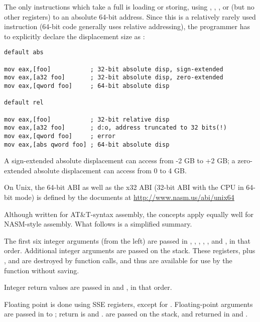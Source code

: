 The only instructions which take a full 
is loading or storing, using , , , 
or  (but no other registers) to an absolute 64-bit address.
Since this is a relatively rarely used instruction (64-bit code
generally uses relative addressing), the programmer has to explicitly
declare the displacement size as :

\begin{lstlisting}
default abs

mov eax,[foo]           ; 32-bit absolute disp, sign-extended
mov eax,[a32 foo]       ; 32-bit absolute disp, zero-extended
mov eax,[qword foo]     ; 64-bit absolute disp

default rel

mov eax,[foo]           ; 32-bit relative disp
mov eax,[a32 foo]       ; d:o, address truncated to 32 bits(!)
mov eax,[qword foo]     ; error
mov eax,[abs qword foo] ; 64-bit absolute disp
\end{lstlisting}

A sign-extended absolute displacement can access from -2 GB to +2 GB;
a zero-extended absolute displacement can access from 0 to 4 GB.


On Unix, the 64-bit ABI as well as the x32 ABI (32-bit ABI with the
CPU in 64-bit mode) is defined by the documents at
\href{http://www.nasm.us/abi/unix64}{http://www.nasm.us/abi/unix64}

Although written for AT\&T-syntax assembly, the concepts apply equally
well for NASM-style assembly. What follows is a simplified summary.

The first six integer arguments (from the left) are passed in ,
, , , , and , in that
order. Additional integer arguments are passed on the stack. These
registers, plus ,  and  are destroyed
by function calls, and thus are available for use by the function
without saving.

Integer return values are passed in  and ,
in that order.

Floating point is done using SSE registers, except for .
Floating-point arguments are passed in  to ;
return is  and .  are passed
on the stack, and returned in  and .

